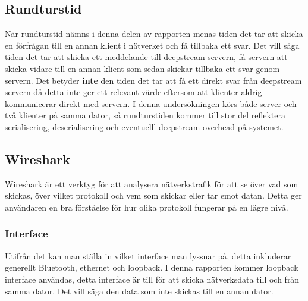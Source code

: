 \subsection{Rundturstid}
När rundturstid nämns i denna delen av rapporten menas tiden det tar att skicka en förfrågan till en annan klient i nätverket och få tillbaka ett svar. Det vill säga tiden det tar att skicka ett meddelande till deepstream servern, få servern att skicka vidare till en annan klient som sedan skickar tillbaka ett svar genom servern. Det betyder \textbf{inte} den tiden det tar att få ett direkt svar från deepstream servern då detta inte ger ett relevant värde eftersom att klienter aldrig kommunicerar direkt med servern. I denna undersökningen körs både server och två klienter på samma dator, så rundturstiden kommer till stor del reflektera serialisering, deserialisering och eventuelll deepstream overhead på systemet.

\subsection{Wireshark}
Wireshark är ett verktyg för att analysera nätverkstrafik för att se över vad som skickas, över vilket protokoll och vem som skickar eller tar emot datan.\cite{wireshark:main} Detta ger användaren en bra förståelse för hur olika protokoll fungerar på en lägre nivå.

\subsubsection{Interface}
Utifrån det kan man ställa in vilket interface\cite[p.~364]{networking} man lyssnar på, detta inkluderar generellt Bluetooth, ethernet och loopback. I denna rapporten kommer loopback interface användas, detta interface är till för att skicka nätverksdata till och från samma dator. Det vill säga den data som inte skickas till en annan dator.
